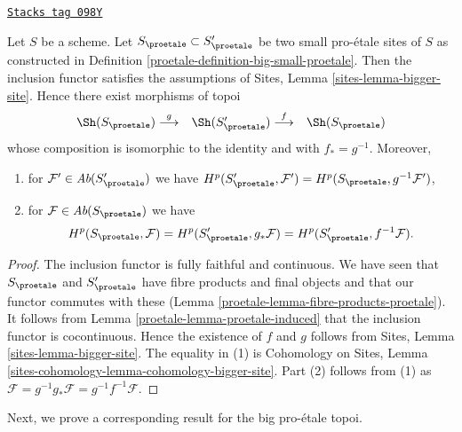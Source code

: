 \begin{lemma}
\label{proetale-lemma-proetale-cohomology-independent-partial-universe}
\href{https://stacks.math.columbia.edu/tag/098Y}{\texttt{Stacks tag 098Y}}

Let $S$ be a scheme. Let $S_\proetale \subset S_\proetale'$ be
two small pro-\'etale sites of $S$ as constructed in
Definition \ref{proetale-definition-big-small-proetale}. Then the inclusion functor
satisfies the assumptions of
Sites, Lemma \ref{sites-lemma-bigger-site}.
Hence there exist morphisms of topoi
$$
\begin{array}{ccc}\Sh(S_\proetale) \overset{g}{\longrightarrow} & \Sh(S_\proetale') \overset{f}{\longrightarrow} & \Sh(S_\proetale)\end{array}
$$
whose composition is isomorphic to the identity and with $f_* = g^{-1}$.
Moreover,
\begin{enumerate}
\item for $\mathcal{F}' \in \textit{Ab}(S_\proetale')$ we have
$H^p(S_\proetale', \mathcal{F}') = H^p(S_\proetale, g^{-1}\mathcal{F}')$,
\item for $\mathcal{F} \in \textit{Ab}(S_\proetale)$ we have
$$
H^p(S_\proetale, \mathcal{F}) =
H^p(S_\proetale', g_*\mathcal{F}) =
H^p(S_\proetale', f^{-1}\mathcal{F}).
$$
\end{enumerate}
\end{lemma}

\begin{proof}

The inclusion functor is fully faithful and continuous.
We have seen that $S_\proetale$ and $S_\proetale'$ have fibre products
and final objects and that our functor commutes with these
(Lemma \ref{proetale-lemma-fibre-products-proetale}).
It follows from Lemma \ref{proetale-lemma-proetale-induced}
that the inclusion functor is cocontinuous.
Hence the existence of $f$ and $g$ follows from
Sites, Lemma \ref{sites-lemma-bigger-site}.
The equality in (1) is
Cohomology on Sites, Lemma \ref{sites-cohomology-lemma-cohomology-bigger-site}.
Part (2) follows from (1) as
$\mathcal{F} = g^{-1}g_*\mathcal{F} = g^{-1}f^{-1}\mathcal{F}$.
\end{proof}

Next, we prove a corresponding result for the big pro-\'etale topoi.

